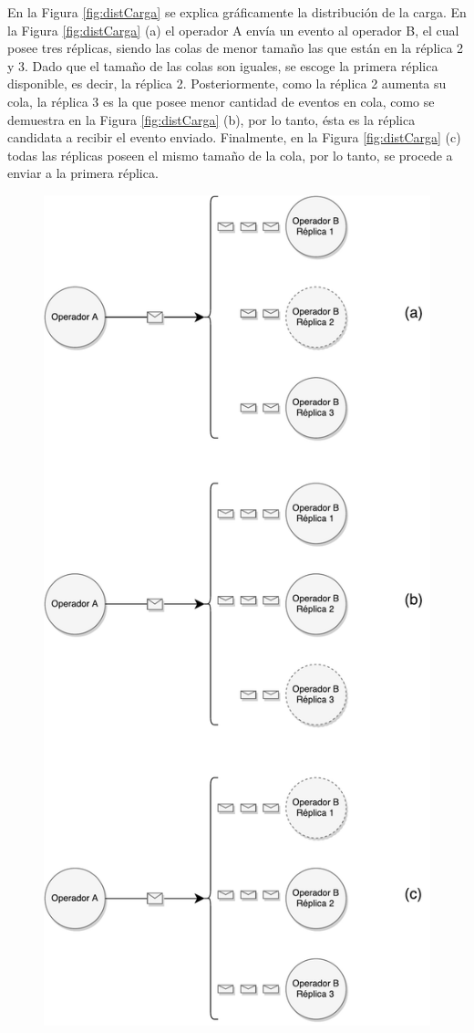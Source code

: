 En la Figura \ref{fig:distCarga} se explica gráficamente la distribución de la carga. En la Figura \ref{fig:distCarga} (a) el operador A envía un evento al operador B, el cual posee tres réplicas, siendo \normalsize{las colas de menor tamaño} las que están en la réplica 2 y 3. Dado que el tamaño de las colas son iguales, se escoge la primera réplica disponible, es decir, la réplica 2. Posteriormente, como la réplica 2 aumenta su cola, la réplica 3 es la que posee menor cantidad de eventos en cola, como se demuestra en la Figura \ref{fig:distCarga} (b), por lo tanto, ésta es la réplica candidata a recibir el evento enviado. Finalmente, en la Figura \ref{fig:distCarga} (c) todas las réplicas poseen el mismo tamaño de la cola, por lo tanto, se procede a enviar a la primera réplica.

\begin{figure}[!ht]
	\centering
		\includegraphics[scale=0.4]{images/DistribucionCarga.pdf}

\end{figure}
